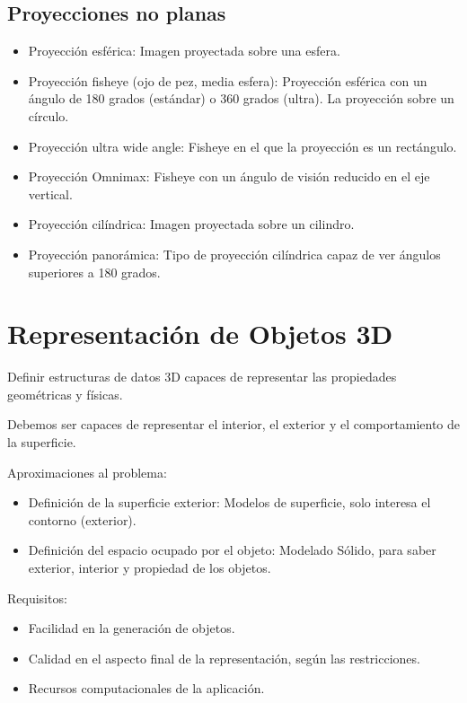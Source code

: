 \subsection{Proyecciones no planas}
\begin{itemize}
	\item Proyección esférica: Imagen proyectada sobre una esfera.
	\item Proyección fisheye (ojo de pez, media esfera): Proyección esférica con un ángulo de 180 grados (estándar) o 360 grados (ultra). La proyección sobre un círculo.
	\item Proyección ultra wide angle: Fisheye en el que la proyección es un rectángulo.
	\item Proyección Omnimax: Fisheye con un ángulo de visión reducido en el eje vertical.
	\item Proyección cilíndrica: Imagen proyectada sobre un cilindro.
	\item Proyección panorámica: Tipo de proyección cilíndrica capaz de ver ángulos superiores a 180 grados.
\end{itemize}

\section{Representación de Objetos 3D}
Definir estructuras de datos 3D capaces de representar las propiedades geométricas y físicas.

Debemos ser capaces de representar el interior, el exterior y el comportamiento de la superficie.

Aproximaciones al problema:
\begin{itemize}
	\item Definición de la superficie exterior: Modelos de superficie, solo interesa el contorno (exterior).
	\item Definición del espacio ocupado por el objeto: Modelado Sólido, para saber exterior, interior y propiedad de los objetos.
\end{itemize}

Requisitos:
\begin{itemize}
	\item Facilidad en la generación de objetos.
	\item Calidad en el aspecto final de la representación, según las restricciones.
	\item Recursos computacionales de la aplicación.
\end{itemize}

